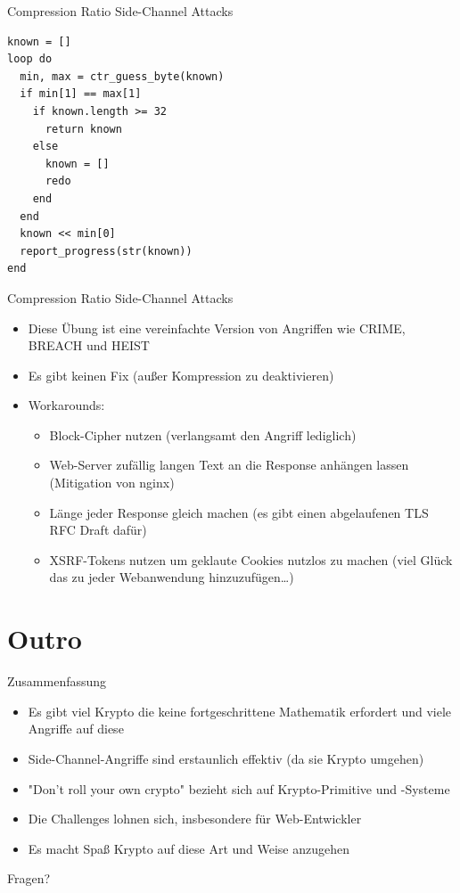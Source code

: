 \documentclass[presentation]{beamer}
\begin{document}
\begin{frame}[fragile,label={sec:org4d09c16}]{Compression Ratio Side-Channel Attacks}
 \begin{verbatim}
known = []
loop do
  min, max = ctr_guess_byte(known)
  if min[1] == max[1]
    if known.length >= 32
      return known
    else
      known = []
      redo
    end
  end
  known << min[0]
  report_progress(str(known))
end
\end{verbatim}
\end{frame}

\begin{frame}[label={sec:org2ade7cb}]{Compression Ratio Side-Channel Attacks}
\begin{itemize}
\item Diese Übung ist eine vereinfachte Version von Angriffen wie CRIME,
BREACH und HEIST
\item Es gibt keinen Fix (außer Kompression zu deaktivieren)
\item Workarounds:
\begin{itemize}
\item Block-Cipher nutzen (verlangsamt den Angriff lediglich)
\item Web-Server zufällig langen Text an die Response anhängen lassen
(Mitigation von nginx)
\item Länge jeder Response gleich machen (es gibt einen abgelaufenen TLS
RFC Draft dafür)
\item XSRF-Tokens nutzen um geklaute Cookies nutzlos zu machen (viel
Glück das zu jeder Webanwendung hinzuzufügen\ldots{})
\end{itemize}
\end{itemize}
\end{frame}

\section{Outro}
\label{sec:org8c129e2}

\begin{frame}[label={sec:orgefa50b4}]{Zusammenfassung}
\begin{itemize}
\item Es gibt viel Krypto die keine fortgeschrittene Mathematik erfordert
und viele Angriffe auf diese
\item Side-Channel-Angriffe sind erstaunlich effektiv (da sie Krypto
umgehen)
\item "Don't roll your own crypto" bezieht sich auf Krypto-Primitive und
-Systeme
\item Die Challenges lohnen sich, insbesondere für Web-Entwickler
\item Es macht Spaß Krypto auf diese Art und Weise anzugehen
\end{itemize}
\end{frame}

\begin{frame}[label={sec:orgc05c05c}]{Fragen?}
\end{frame}
\end{document}

